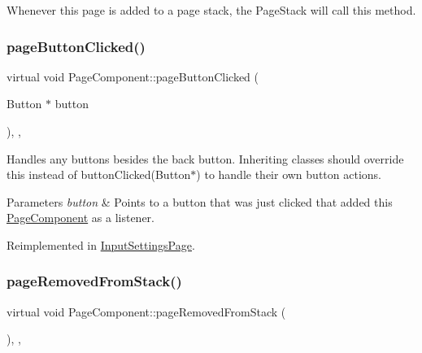 Whenever this page is added to a page stack, the Page\+Stack will call this method. \mbox{\label{classPageComponent_a048ad03d61031e4e89ffed12916db9ae}} 
\subsubsection{\texorpdfstring{page\+Button\+Clicked()}{pageButtonClicked()}}
{\footnotesize\ttfamily virtual void Page\+Component\+::page\+Button\+Clicked (\begin{DoxyParamCaption}\item[{Button $\ast$}]{button }\end{DoxyParamCaption})\hspace{0.3cm}{\ttfamily [inline]}, {\ttfamily [protected]}, {\ttfamily [virtual]}}

Handles any buttons besides the back button. Inheriting classes should override this instead of button\+Clicked(\+Button$\ast$) to handle their own button actions.


\begin{DoxyParams}{Parameters}
{\em button} & Points to a button that was just clicked that added this \mbox{\hyperlink{classPageComponent}{Page\+Component}} as a listener. \\
\hline
\end{DoxyParams}


Reimplemented in \mbox{\hyperlink{classInputSettingsPage_a89fcfdf1adb1d8a7a1ba03a2325d72f2}{Input\+Settings\+Page}}.

\mbox{\label{classPageComponent_a50d861b6ec4c25dcaa8de2db68cc3b5e}} 
\subsubsection{\texorpdfstring{page\+Removed\+From\+Stack()}{pageRemovedFromStack()}}
{\footnotesize\ttfamily virtual void Page\+Component\+::page\+Removed\+From\+Stack (\begin{DoxyParamCaption}{ }\end{DoxyParamCaption})\hspace{0.3cm}{\ttfamily [inline]}, {\ttfamily [protected]}, {\ttfamily [virtual]}}

